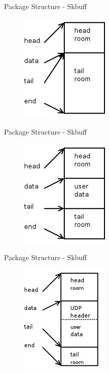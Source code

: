 \documentclass{workshop}
\begin{document}
\begin{frame}{Package Structure - Skbuff}

\begin{figure}
  \includegraphics[scale=0.35]{img/2.png}
\end{figure}
\end{frame}

\begin{frame}{Package Structure - Skbuff}

\begin{figure}
  \includegraphics[scale=0.35]{img/3.png}
\end{figure}
\end{frame}

\begin{frame}{Package Structure - Skbuff}

\begin{figure}
  \includegraphics[scale=0.5]{img/4.png}
\end{figure}
\end{frame}
\end{document}
